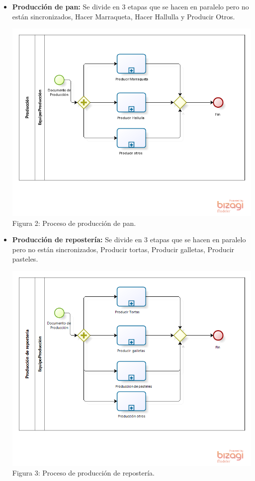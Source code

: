 \begin{itemize}

\item \textbf{Producción de pan:} Se divide en 3 etapas que se hacen en paralelo pero no están sincronizados, Hacer Marraqueta, Hacer Hallulla y Producir Otros.

\begin{center}
\includegraphics[width=13cm]{./imagenes/produccion_pan.png}\\
Figura 2: Proceso de producción de pan.
\end{center}

\item \textbf{Producción de repostería:} Se divide en 3 etapas que se hacen en paralelo pero no están sincronizados, Producir tortas, Producir galletas, Producir pasteles.

\begin{center}
\includegraphics[width=13cm]{./imagenes/produccion_reposteria.png}\\
Figura 3: Proceso de producción de repostería.
\end{center}


\end{itemize}
